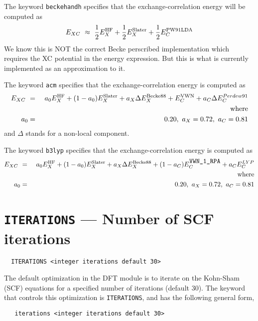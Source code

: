 The keyword \verb+beckehandh+ specifies that the exchange-correlation energy will be
computed as 
\begin{eqnarray*}
E_{XC} \ \approx \ \frac{1}{2} E^{\rm HF}_X + \frac{1}{2} E^{\rm
  Slater}_{X} + \frac{1}{2} E^{\rm PW91LDA}_{C}
\end{eqnarray*}
We know this is NOT the correct Becke perscribed implementation which
requires the XC potential in the energy expression.  But this is what
is currently implemented as an approximation to it.



The keyword \verb+acm+ specifies that the exchange-correlation energy
is computed as
\begin{eqnarray*}
E_{XC} \ &=& \ a_0 E^{\rm HF}_X + (1-a_0) E^{\rm Slater}_{X} +
a_X \Delta E^{\rm Becke88}_{X} + E^{\rm VWN}_C + a_C \Delta E^{Perdew91}_C \\
& &{\rm where } \\
a_0 &=& 0.20, \ a_X = 0.72, \ a_C = 0.81
\end{eqnarray*}
and $\Delta$ stands for a non-local component.


The keyword \verb+b3lyp+ specifies that the exchange-correlation energy
is computed as
\begin{eqnarray*}
E_{XC} \ &=& \ a_0 E^{\rm HF}_X + (1-a_0) E^{\rm Slater}_{X} +
a_X \Delta E^{\rm Becke88}_{X} + (1-a_C)E^{\rm \verb+VWN_1_RPA+}_C + a_C E^{LYP}_C \\
& &{\rm where } \\
a_0 &=& 0.20, \ a_X = 0.72, \ a_C = 0.81
\end{eqnarray*}


\section{{\tt ITERATIONS} --- Number of SCF iterations}

\begin{verbatim}
  ITERATIONS <integer iterations default 30>
\end{verbatim}

The default optimization in the DFT module is to iterate on the 
Kohn-Sham (SCF) equations for a specified number of iterations
(default 30).  The keyword that controls this optimization 
is \verb+ITERATIONS+, and has the following general form,

\begin{verbatim}
   iterations <integer iterations default 30>
\end{verbatim}

